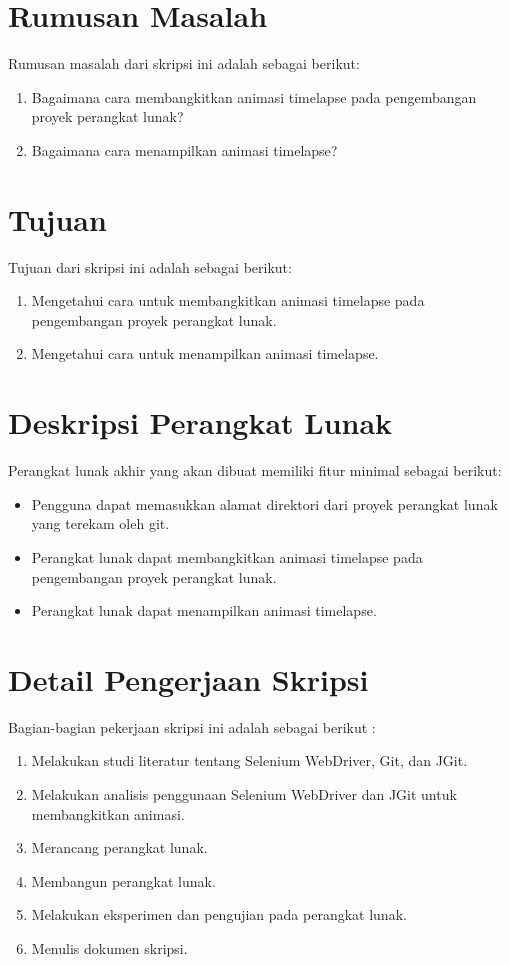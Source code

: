 \documentclass[a4paper,twoside]{article}
\begin{document}
\section{Rumusan Masalah}
Rumusan masalah dari skripsi ini adalah sebagai berikut:
\begin{enumerate}
	\item Bagaimana cara membangkitkan animasi timelapse pada pengembangan proyek perangkat lunak?
	\item Bagaimana cara menampilkan animasi timelapse?
\end{enumerate}
\section{Tujuan}
Tujuan dari skripsi ini adalah sebagai berikut:
\begin{enumerate}
	\item Mengetahui cara untuk membangkitkan animasi timelapse pada pengembangan proyek perangkat lunak.
	\item Mengetahui cara untuk menampilkan animasi timelapse. \\
\end{enumerate} 
\section{Deskripsi Perangkat Lunak}
Perangkat lunak akhir yang akan dibuat memiliki fitur minimal sebagai berikut:
\begin{itemize}
	\item Pengguna dapat memasukkan alamat direktori dari proyek perangkat lunak yang terekam oleh git.   
	\item Perangkat lunak dapat membangkitkan animasi timelapse pada pengembangan proyek perangkat lunak.
	\item Perangkat lunak dapat menampilkan animasi timelapse. 
\end{itemize}
\section{Detail Pengerjaan Skripsi}
Bagian-bagian pekerjaan skripsi ini adalah sebagai berikut :
	\begin{enumerate}
		\item Melakukan studi literatur tentang Selenium WebDriver, Git, dan JGit.
		\item Melakukan analisis penggunaan Selenium WebDriver dan JGit untuk membangkitkan animasi.
		\item Merancang perangkat lunak.
		\item Membangun perangkat lunak.
		\item Melakukan eksperimen dan pengujian pada perangkat lunak.
		\item Menulis dokumen skripsi.
	\end{enumerate}
\end{document}
